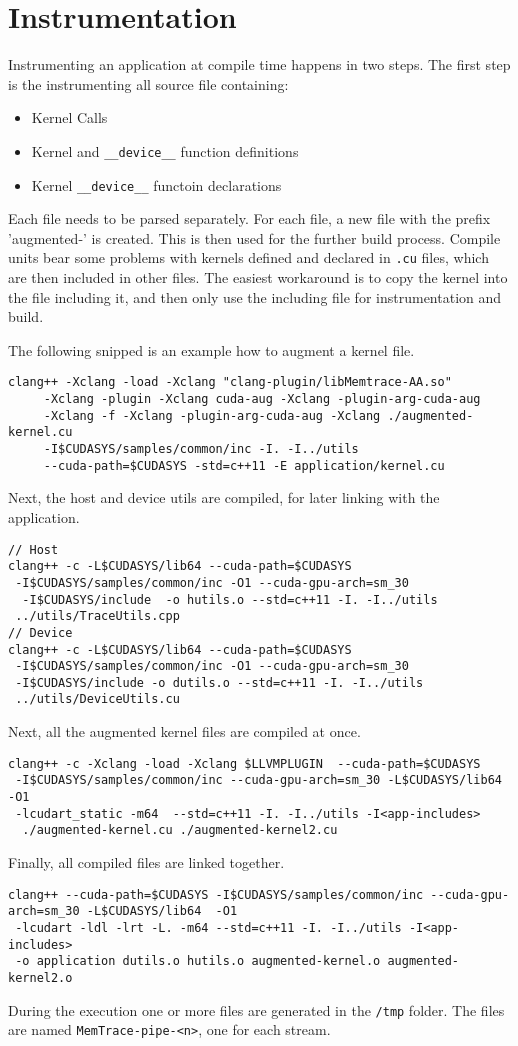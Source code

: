 \chapter{Instrumentation}
Instrumenting an application at compile time happens in two steps. The first step is the instrumenting all 
source file containing:
\begin{itemize}
	\item Kernel Calls
	\item Kernel and \verb|__device__| function definitions
	\item Kernel \verb|__device__| functoin declarations
\end{itemize}

Each file needs to be parsed separately. For each file, a new file with the prefix 'augmented-' is created. This is then used for
the further build process. Compile units bear some problems with kernels defined and declared in \verb|.cu| files, which are then included
in other files. The easiest workaround is to copy the kernel into the file including it, and then only use the including file for instrumentation and build.

The following snipped is an example how to augment a kernel file.
\begin{lstlisting}[style=C]
clang++ -Xclang -load -Xclang "clang-plugin/libMemtrace-AA.so"
	 -Xclang -plugin -Xclang cuda-aug -Xclang -plugin-arg-cuda-aug 
	 -Xclang -f -Xclang -plugin-arg-cuda-aug -Xclang ./augmented-kernel.cu 
	 -I$CUDASYS/samples/common/inc -I. -I../utils
     --cuda-path=$CUDASYS -std=c++11 -E application/kernel.cu 
\end{lstlisting}

Next, the host and device utils are compiled, for later linking with the application.
\begin{lstlisting}[style=C]
// Host
clang++ -c -L$CUDASYS/lib64 --cuda-path=$CUDASYS 
 -I$CUDASYS/samples/common/inc -O1 --cuda-gpu-arch=sm_30
  -I$CUDASYS/include  -o hutils.o --std=c++11 -I. -I../utils
 ../utils/TraceUtils.cpp
// Device
clang++ -c -L$CUDASYS/lib64 --cuda-path=$CUDASYS 
 -I$CUDASYS/samples/common/inc -O1 --cuda-gpu-arch=sm_30
 -I$CUDASYS/include -o dutils.o --std=c++11 -I. -I../utils
 ../utils/DeviceUtils.cu
\end{lstlisting}
Next, all the augmented kernel files are compiled at once.
\begin{lstlisting}[style=C]
clang++ -c -Xclang -load -Xclang $LLVMPLUGIN  --cuda-path=$CUDASYS
 -I$CUDASYS/samples/common/inc --cuda-gpu-arch=sm_30 -L$CUDASYS/lib64  -O1
 -lcudart_static -m64  --std=c++11 -I. -I../utils -I<app-includes>
  ./augmented-kernel.cu ./augmented-kernel2.cu
\end{lstlisting}
Finally, all compiled files are linked together.
\begin{lstlisting}[style=C]
clang++ --cuda-path=$CUDASYS -I$CUDASYS/samples/common/inc --cuda-gpu-arch=sm_30 -L$CUDASYS/lib64  -O1
 -lcudart -ldl -lrt -L. -m64 --std=c++11 -I. -I../utils -I<app-includes>
 -o application dutils.o hutils.o augmented-kernel.o augmented-kernel2.o
\end{lstlisting}

During the execution one or more files are generated in the \verb|/tmp| folder. The files are named \verb|MemTrace-pipe-<n>|, one for
each stream.
